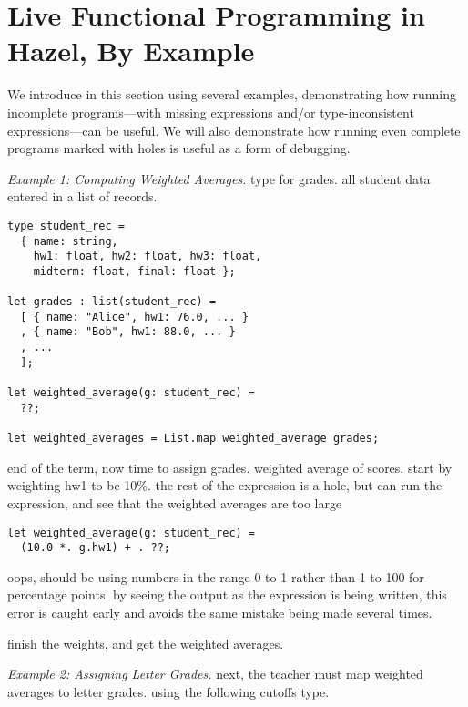 \newcommand{\examplesSec}{Live Functional Programming in Hazel, By Example}
\section{\protect\examplesSec} %
\label{sec:examples}

We introduce \HazelnutLive{} in this section using several examples,
demonstrating how running incomplete programs---with missing expressions and/or
type-inconsistent expressions---can be useful.
%
We will also demonstrate how running even complete programs marked with holes is
useful as a form of debugging.



\emph{Example 1: Computing Weighted Averages.}
%
type for grades.
%
all student data entered in a list of records.

\begin{lstlisting}
type student_rec =
  { name: string,
    hw1: float, hw2: float, hw3: float,
    midterm: float, final: float };

let grades : list(student_rec) =
  [ { name: "Alice", hw1: 76.0, ... }
  , { name: "Bob", hw1: 88.0, ... }
  , ...
  ];

let weighted_average(g: student_rec) =
  ??;

let weighted_averages = List.map weighted_average grades;
\end{lstlisting}

end of the term, now time to assign grades.
%
weighted average of scores.
%
start by weighting hw1 to be 10\%. the rest of the expression is a hole, but can
run the expression, and see that the weighted averages are too large
%

\begin{lstlisting}
let weighted_average(g: student_rec) =
  (10.0 *. g.hw1) + . ??;
\end{lstlisting}

oops, should be using numbers in the range 0 to 1 rather than 1 to 100 for
percentage points.
%
by seeing the output as the expression is being written, this error is caught
early and avoids the same mistake being made several times.

finish the weights, and get the weighted averages.

\emph{Example 2: Assigning Letter Grades.}
%
next, the teacher must map weighted averages to letter grades.
%
using the following cutoffs type.

